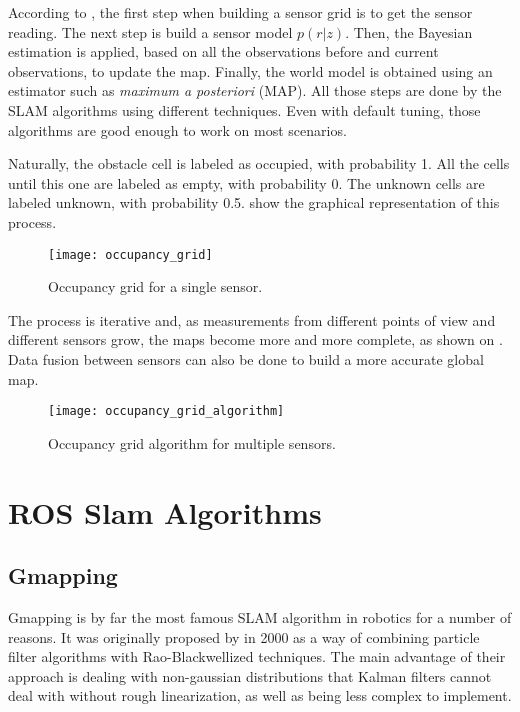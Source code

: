 According to , the first step when building a sensor grid is to get the sensor reading. The next step is build a sensor model $p(r|z)$. Then, the Bayesian estimation is applied, based on all the observations before and current observations, to update the map. Finally, the world model is obtained using an estimator such as \textit{maximum a posteriori} (MAP). All those steps are done by the SLAM algorithms using different techniques. Even with default tuning, those algorithms are good enough to work on most scenarios.

Naturally, the obstacle cell is labeled as occupied, with probability 1. All the cells until this one are labeled as empty, with probability 0. The unknown cells are labeled unknown, with probability 0.5.  show the graphical representation of this process.

\begin{figure}[!ht]
    \centering
    \texttt{[image: occupancy\_grid]}
    \caption{Occupancy grid for a single sensor.}
    \label{fig:occupancy_grid}
\end{figure}

The process is iterative and, as measurements from different points of view and different sensors grow, the maps become more and more complete, as shown on . Data fusion between sensors can also be done to build a more accurate global map.

\begin{figure}[!ht]
    \centering
    \texttt{[image: occupancy\_grid\_algorithm]}
    \caption{Occupancy grid algorithm for multiple sensors.}
    \label{fig:occupancy_grid_algorithm}
\end{figure}

\section{ROS Slam Algorithms}

\subsection{Gmapping}

Gmapping is by far the most famous SLAM algorithm in robotics for a number of reasons. It was originally proposed by \citeauthor{doucet2000rao} in 2000 as a way of combining particle filter algorithms with Rao-Blackwellized techniques. The main advantage of their approach is dealing with non-gaussian distributions that Kalman filters cannot deal with without rough linearization, as well as being less complex to implement.

